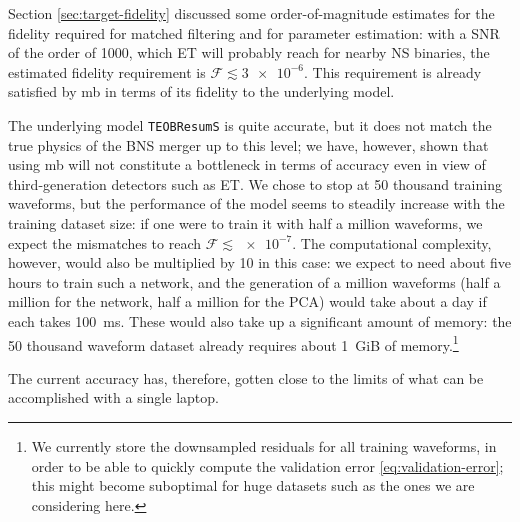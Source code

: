 \documentclass[main.tex]{subfiles}
\begin{document}
Section \ref{sec:target-fidelity} discussed some order-of-magnitude estimates for the fidelity required for matched filtering and for parameter estimation: with a \ac{SNR} of the order of 1000, which \ac{ET} will probably reach for nearby \ac{NS} binaries, the estimated fidelity requirement is \(\mathcal{F} \lesssim \num{3e-6}\). 
This requirement is already satisfied by \ac{mb} in terms of its fidelity to the underlying model. 

The underlying model \texttt{TEOBResumS} is quite accurate, but it does not match the true physics of the \ac{BNS} merger up to this level; we have, however, shown that using \ac{mb} will not constitute a bottleneck in terms of accuracy even in view of third-generation detectors such as \ac{ET}.
We chose to stop at 50 thousand training waveforms, but the performance of the model seems to steadily increase with the training dataset size: if one were to train it with half a million waveforms, we expect the mismatches to reach \(\mathcal{F} \lesssim \num{e-7}\).
The computational complexity, however, would also be multiplied by 10 in this case: we expect to need about five hours to train such a network, and the generation of a million waveforms (half a million for the network, half a million for the \ac{PCA}) would take about a day if each takes \SI{100}{ms}. 
These would also take up a significant amount of memory: the 50 thousand waveform dataset already requires about \SI{1}{GiB} of memory.\footnote{We currently store the downsampled residuals for all training waveforms, in order to be able to quickly compute the validation error \eqref{eq:validation-error}; this might become suboptimal for huge datasets such as the ones we are considering here.}

The current accuracy has, therefore, gotten close to the limits of what can be accomplished with a single laptop.


\end{document}
